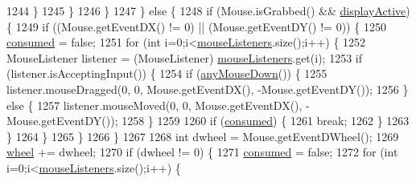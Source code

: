\begin{DoxyCode}
1244                         \}
1245                     \}
1246                 \}
1247             \} \textcolor{keywordflow}{else} \{
1248                 \textcolor{keywordflow}{if} (Mouse.isGrabbed() && \mbox{\hyperlink{classorg_1_1newdawn_1_1slick_1_1_input_a2bca09cd95bf97dace22ffc219cf08a9}{displayActive}}) \{
1249                     \textcolor{keywordflow}{if} ((Mouse.getEventDX() != 0) || (Mouse.getEventDY() != 0)) \{
1250                         \mbox{\hyperlink{classorg_1_1newdawn_1_1slick_1_1_input_af37be3b950898acb03ac33cca068cc9a}{consumed}} = \textcolor{keyword}{false};
1251                         \textcolor{keywordflow}{for} (\textcolor{keywordtype}{int} i=0;i<\mbox{\hyperlink{classorg_1_1newdawn_1_1slick_1_1_input_a14f9c58eb48c498073f11c6934d92998}{mouseListeners}}.size();i++) \{
1252                             MouseListener listener = (MouseListener) 
      \mbox{\hyperlink{classorg_1_1newdawn_1_1slick_1_1_input_a14f9c58eb48c498073f11c6934d92998}{mouseListeners}}.get(i);
1253                             \textcolor{keywordflow}{if} (listener.isAcceptingInput()) \{
1254                                 \textcolor{keywordflow}{if} (\mbox{\hyperlink{classorg_1_1newdawn_1_1slick_1_1_input_a464c573c84e5d67e2845b8745370c7a7}{anyMouseDown}}()) \{
1255                                     listener.mouseDragged(0, 0, Mouse.getEventDX(), -Mouse.getEventDY());   
1256                                 \} \textcolor{keywordflow}{else} \{
1257                                     listener.mouseMoved(0, 0, Mouse.getEventDX(), -Mouse.getEventDY());
1258                                 \}
1259                                 
1260                                 \textcolor{keywordflow}{if} (\mbox{\hyperlink{classorg_1_1newdawn_1_1slick_1_1_input_af37be3b950898acb03ac33cca068cc9a}{consumed}}) \{
1261                                     \textcolor{keywordflow}{break};
1262                                 \}
1263                             \}
1264                         \}
1265                     \}
1266                 \}
1267                 
1268                 \textcolor{keywordtype}{int} dwheel = Mouse.getEventDWheel();
1269                 \mbox{\hyperlink{classorg_1_1newdawn_1_1slick_1_1_input_aad1c93f95c8592e2a5414f852d4fdf99}{wheel}} += dwheel;
1270                 \textcolor{keywordflow}{if} (dwheel != 0) \{
1271                     \mbox{\hyperlink{classorg_1_1newdawn_1_1slick_1_1_input_af37be3b950898acb03ac33cca068cc9a}{consumed}} = \textcolor{keyword}{false};
1272                     \textcolor{keywordflow}{for} (\textcolor{keywordtype}{int} i=0;i<\mbox{\hyperlink{classorg_1_1newdawn_1_1slick_1_1_input_a14f9c58eb48c498073f11c6934d92998}{mouseListeners}}.size();i++) \{

\end{DoxyCode}
